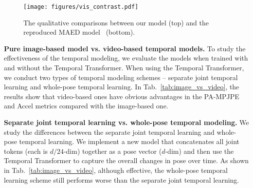 \begin{figure}[t]
	\centering
	\texttt{[image: figures/vis\_contrast.pdf]}
	\caption{The qualitative comparisons between our model (top) and the reproduced MAED model~\citep{maed:wan2021encoder} (bottom).  
	}
	\label{fig:vis_contrast_3dpw}
\end{figure}


{\bf Pure image-based model vs. video-based temporal models.} To study the effectiveness of the temporal modeling, we evaluate the models when trained with and without the Temporal Transformer. When using the Temporal Transformer, we conduct two types of temporal modeling schemes -- separate joint temporal learning and whole-pose temporal learning. In Tab.~\ref{tab:image_vs_video}, the results show that video-based ones have obvious advantages in the PA-MPJPE and Accel metrics compared with the image-based one.

{\bf Separate joint temporal learning vs. whole-pose temporal modeling.} We study the differences between the separate joint temporal learning and whole-pose temporal learning. We implement a new model that concatenates all joint tokens (each is $d/24$-dim) together as a pose vector ($d$-dim) and then use the Temporal Transformer to capture the overall changes in pose over time. As shown in Tab.~\ref{tab:image_vs_video}, although effective, the whole-pose temporal learning scheme still performs worse than the separate joint temporal learning.


\begin{table*}[!htbp]\small
	\caption{Comparisons with the temporal modeling of MAED. We report the MAED result we reproduced.}
	\label{tab:comparison_maed}
	\centering
%	



\end{table*}

